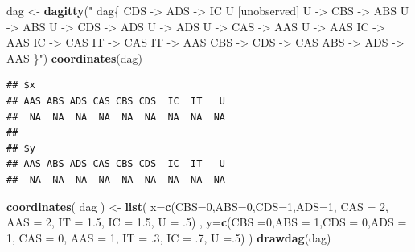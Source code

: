 \documentclass[10pt,dvipsnames,enabledeprecatedfontcommands]{scrartcl}
\newenvironment{Shaded}{\begin{snugshade}}{\end{snugshade}}
\newcommand{\KeywordTok}[1]{\textcolor[rgb]{0.13,0.29,0.53}{\textbf{#1}}}
\newcommand{\DataTypeTok}[1]{\textcolor[rgb]{0.13,0.29,0.53}{#1}}
\newcommand{\DecValTok}[1]{\textcolor[rgb]{0.00,0.00,0.81}{#1}}
\newcommand{\FloatTok}[1]{\textcolor[rgb]{0.00,0.00,0.81}{#1}}
\newcommand{\StringTok}[1]{\textcolor[rgb]{0.31,0.60,0.02}{#1}}
\newcommand{\NormalTok}[1]{#1}
\begin{document}
\begin{Shaded}
\begin{Highlighting}[]
\NormalTok{dag <-}\StringTok{ }\KeywordTok{dagitty}\NormalTok{(}\StringTok{"}
\StringTok{  dag\{}
\StringTok{  CDS -> ADS -> IC  }
\StringTok{               U [unobserved]   }
\StringTok{               U -> CBS -> ABS  }
\StringTok{               U -> ABS        }
\StringTok{               U -> CDS -> ADS  }
\StringTok{               U -> ADS         }
\StringTok{               U -> CAS -> AAS    }
\StringTok{               U -> AAS                        }
\StringTok{               IC -> AAS        }
\StringTok{               IC -> CAS        }
\StringTok{               IT -> CAS        }
\StringTok{               IT -> AAS}
\StringTok{               CBS -> CDS -> CAS}
\StringTok{               ABS -> ADS -> AAS}
\StringTok{               \}"}\NormalTok{)}
\KeywordTok{coordinates}\NormalTok{(dag)}
\end{Highlighting}
\end{Shaded}

\begin{verbatim}
## $x
## AAS ABS ADS CAS CBS CDS  IC  IT   U 
##  NA  NA  NA  NA  NA  NA  NA  NA  NA 
## 
## $y
## AAS ABS ADS CAS CBS CDS  IC  IT   U 
##  NA  NA  NA  NA  NA  NA  NA  NA  NA
\end{verbatim}

\begin{Shaded}
\begin{Highlighting}[]
\KeywordTok{coordinates}\NormalTok{( dag ) <-}\StringTok{ }\KeywordTok{list}\NormalTok{( }\DataTypeTok{x=}\KeywordTok{c}\NormalTok{(}\DataTypeTok{CBS=}\DecValTok{0}\NormalTok{,}\DataTypeTok{ABS=}\DecValTok{0}\NormalTok{,}\DataTypeTok{CDS=}\DecValTok{1}\NormalTok{,}\DataTypeTok{ADS=}\DecValTok{1}\NormalTok{, }\DataTypeTok{CAS =} \DecValTok{2}\NormalTok{,}
                    \DataTypeTok{AAS =} \DecValTok{2}\NormalTok{, }\DataTypeTok{IT =} \FloatTok{1.5}\NormalTok{, }\DataTypeTok{IC =} \FloatTok{1.5}\NormalTok{, }\DataTypeTok{U =} \FloatTok{.5}\NormalTok{) ,}
\DataTypeTok{y=}\KeywordTok{c}\NormalTok{(}\DataTypeTok{CBS =}\DecValTok{0}\NormalTok{,}\DataTypeTok{ABS =} \DecValTok{1}\NormalTok{,}\DataTypeTok{CDS =} \DecValTok{0}\NormalTok{,}\DataTypeTok{ADS =} \DecValTok{1}\NormalTok{, }\DataTypeTok{CAS =} \DecValTok{0}\NormalTok{, }\DataTypeTok{AAS =} \DecValTok{1}\NormalTok{, }
    \DataTypeTok{IT =} \FloatTok{.3}\NormalTok{, }\DataTypeTok{IC =} \FloatTok{.7}\NormalTok{, }\DataTypeTok{U =}\NormalTok{.}\DecValTok{5}\NormalTok{) )}
\KeywordTok{drawdag}\NormalTok{(dag)}
\end{Highlighting}
\end{Shaded}
\end{document}
